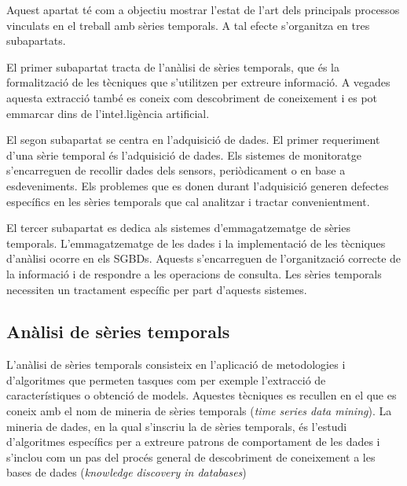 Aquest apartat té com a objectiu mostrar l'estat de l'art dels
principals processos vinculats en el treball amb sèries temporals. A
tal efecte s'organitza en tres subapartats.
 


El primer subapartat tracta de l'anàlisi de sèries temporals, que és
la formalització de les tècniques que s'utilitzen per extreure
informació. A vegades aquesta extracció també es coneix com
descobriment de coneixement i es pot emmarcar dins de l'inte\l.ligència
artificial.


El segon subapartat se centra en l'adquisició de dades. El primer
requeriment d'una sèrie temporal és l'adquisició de dades. Els
sistemes de monitoratge s'encarreguen de recollir dades dels sensors,
periòdicament o en base a esdeveniments.  Els problemes que es donen
durant l'adquisició generen defectes específics en les sèries
temporals que cal analitzar i tractar convenientment.


El tercer subapartat es dedica als sistemes d'emmagatzematge de sèries
temporals. L'emmagatzematge de les dades i la implementació de les
tècniques d'anàlisi ocorre en els \glspl{SGBD}. Aquests s'encarreguen
de l'organització correcte de la informació i de respondre a les
operacions de consulta. Les sèries temporals necessiten un tractament
específic per part d'aquests sistemes.



\subsection{Anàlisi de sèries temporals}




L'anàlisi de sèries temporals consisteix en l'aplicació de
metodologies i d'algoritmes que permeten tasques com per exemple
l'extracció de característiques o obtenció de models.  Aquestes
tècniques es recullen en el que es coneix amb el nom de mineria de
sèries temporals (\emph{time series data mining}). La mineria de
dades, en la qual s'inscriu la de sèries temporals, és l'estudi
d'algoritmes específics per a extreure patrons de comportament de les
dades i s'inclou com un pas del procés general de descobriment de
coneixement a les bases de dades (\emph{knowledge discovery in
  databases}) \parencite{fayyad96,last01}


